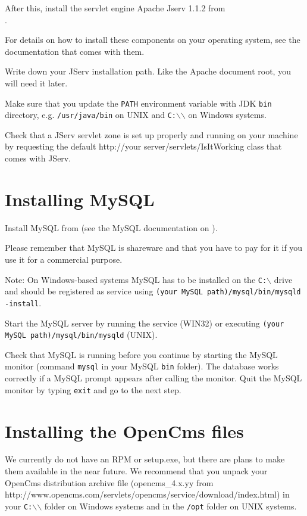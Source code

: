 After this, install the servlet engine Apache Jserv 1.1.2 from \\
.

For details on how to install these components on your operating system,
see the documentation that comes with them.

Write down your JServ installation path. Like the Apache document root, you
will need it later.

Make sure that you update the \texttt{PATH} environment variable with JDK \texttt{bin}
directory, e.g. \texttt{/usr/java/bin} on UNIX and \texttt{C:$\backslash$$\backslash$}
on Windows systems.

Check that a JServ servlet zone is set up properly and running on your 
machine by requesting the default
http://your server/servlets/IsItWorking class that comes with JServ. 

\section{\label{42mysql}Installing MySQL}
Install MySQL from 
(see the MySQL documentation on ). 

Please remember that MySQL 
is shareware and that you have to pay for it if you use it for a commercial purpose.

Note: On Windows-based systems MySQL has to be installed on the \texttt{C:$\backslash$} drive
and should be registered as service using \texttt{(your MySQL path)/mysql/bin/mysqld -install}.

Start the MySQL server by running the service (WIN32) or executing 
\texttt{(your MySQL path)/mysql/bin/mysqld} (UNIX).

Check that MySQL is running before you continue by starting the MySQL monitor 
(command \texttt{mysql} in your MySQL \texttt{bin} folder).
The database works correctly if a MySQL prompt appears after calling the monitor. 
Quit the MySQL monitor by typing \texttt{exit} and go to the next step. 

\section{Installing the OpenCms files}
We currently do not have an RPM or setup.exe, 
but there are plans to make them available in the near future.
We recommend that you unpack your OpenCms distribution archive file 
(opencms\_4.x.yy from \\
{http://www.opencms.com/servlets/opencms/service/download/index.html})
in your \texttt{C:$\backslash$$\backslash$} folder on Windows systems and 
in the \texttt{/opt} folder on UNIX systems. 

